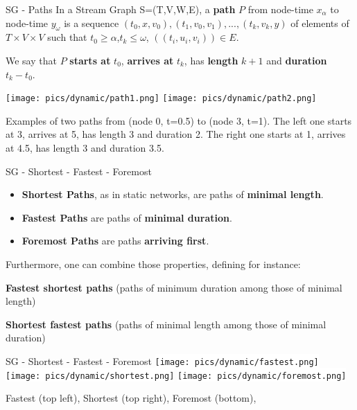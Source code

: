 \begin{textbox}{SG - Paths}
    In a Stream Graph S=(T,V,W,E), a \textbf{path} $P$ from node-time $x_\alpha$ to node-time $y_\omega$ is a sequence $(t_0,x,v_0),(t_1,v_0,v_1),...,(t_k,v_k,y)$ of elements of $T \times V \times V$ such that $t_0\geq \alpha$,$t_k\leq\omega$, $((t_i,u_i,v_i))\in E$.

    We say that $P$ \textbf{starts at} $t_0$, \textbf{arrives at} $t_k$, has \textbf{length} $k+1$ and \textbf{duration} $t_k-t_0$.

    \centering
    \colorbox{white}{\texttt{[image: pics/dynamic/path1.png]}}
    \colorbox{white}{\texttt{[image: pics/dynamic/path2.png]}}

    Examples of two paths from (node 0, t=0.5) to (node 3, t=1). The left one starts at 3, arrives at 5, has length 3 and duration 2. The right one starts at 1, arrives at 4.5, has length 3 and duration 3.5.
\end{textbox}


\begin{textbox}{SG - Shortest - Fastest - Foremost}
    \begin{itemize}
        \item \textbf{Shortest Paths}, as in static networks, are paths of \textbf{minimal length}.
        \item \textbf{Fastest Paths} are paths of \textbf{minimal duration}.
        \item \textbf{Foremost Paths} are paths \textbf{arriving first}.
    \end{itemize}

    Furthermore, one can combine those properties, defining for instance:

    \textbf{Fastest shortest paths} (paths of minimum duration among those of minimal length)

    \textbf{Shortest fastest paths} (paths of minimal length among those of minimal duration)
\end{textbox}

\begin{textbox}{SG - Shortest - Fastest - Foremost}
    \centering
    \colorbox{white}{\texttt{[image: pics/dynamic/fastest.png]}}
    \colorbox{white}{\texttt{[image: pics/dynamic/shortest.png]}}
    \colorbox{white}{\texttt{[image: pics/dynamic/foremost.png]}}

    Fastest (top left),  Shortest (top right), Foremost (bottom),
\end{textbox}

